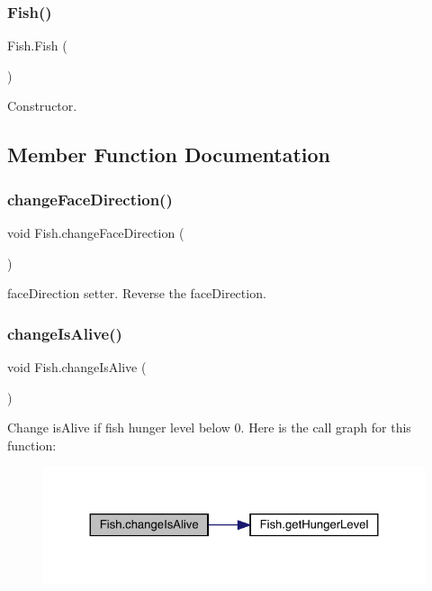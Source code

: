\subsubsection{\texorpdfstring{Fish()}{Fish()}}
{\footnotesize\ttfamily Fish.\+Fish (\begin{DoxyParamCaption}{ }\end{DoxyParamCaption})\hspace{0.3cm}{\ttfamily [inline]}}

Constructor. 

\subsection{Member Function Documentation}
\mbox{\label{class_fish_a9fb18733f43c29b1a4c4b16a6322aec6}} 
\subsubsection{\texorpdfstring{change\+Face\+Direction()}{changeFaceDirection()}}
{\footnotesize\ttfamily void Fish.\+change\+Face\+Direction (\begin{DoxyParamCaption}{ }\end{DoxyParamCaption})\hspace{0.3cm}{\ttfamily [inline]}}

face\+Direction setter. Reverse the face\+Direction. \mbox{\label{class_fish_a88fa149bd62388b1aee597c9ec540369}} 
\subsubsection{\texorpdfstring{change\+Is\+Alive()}{changeIsAlive()}}
{\footnotesize\ttfamily void Fish.\+change\+Is\+Alive (\begin{DoxyParamCaption}{ }\end{DoxyParamCaption})\hspace{0.3cm}{\ttfamily [inline]}}

Change is\+Alive if fish hunger level below 0. Here is the call graph for this function\+:
\nopagebreak
\begin{figure}[H]
\begin{center}
\leavevmode
\includegraphics[width=324pt]{class_fish_a88fa149bd62388b1aee597c9ec540369_cgraph}
\end{center}
\end{figure}
\mbox{\label{class_fish_af226ad690f56674f1b08d9d9562dde83}} 
